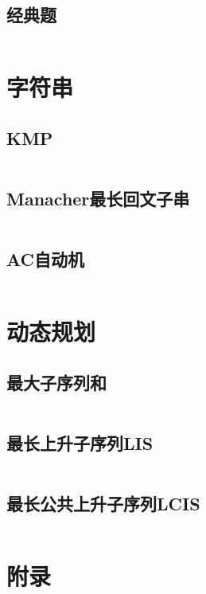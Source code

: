   \subsection{经典题}
    \inputminted{cpp}{src/6_计算几何/6_经典题/1_平面最近点对.cpp}
\section{字符串}
  \subsection{KMP}
    \inputminted{cpp}{src/7_字符串/1_KMP.cpp}
  \subsection{Manacher最长回文子串}
    \inputminted{cpp}{src/7_字符串/2_Manacher最长回文子串.cpp}
  \subsection{AC自动机}
    \inputminted{cpp}{src/7_字符串/3_AC自动机.cpp}
\section{动态规划}
  \subsection{最大子序列和}
    \inputminted{cpp}{src/8_动态规划/1_子序列/1_最大子序列和.cpp}
  \subsection{最长上升子序列LIS}
    \inputminted{cpp}{src/8_动态规划/1_子序列/2_最长上升子序列LIS.cpp}
  \subsection{最长公共上升子序列LCIS}
    \inputminted{cpp}{src/8_动态规划/1_子序列/3_最长公共上升子序列LCIS.cpp}
\section{附录}
  \inputminted{cpp}{src/9_附录/1_读入挂.cpp}